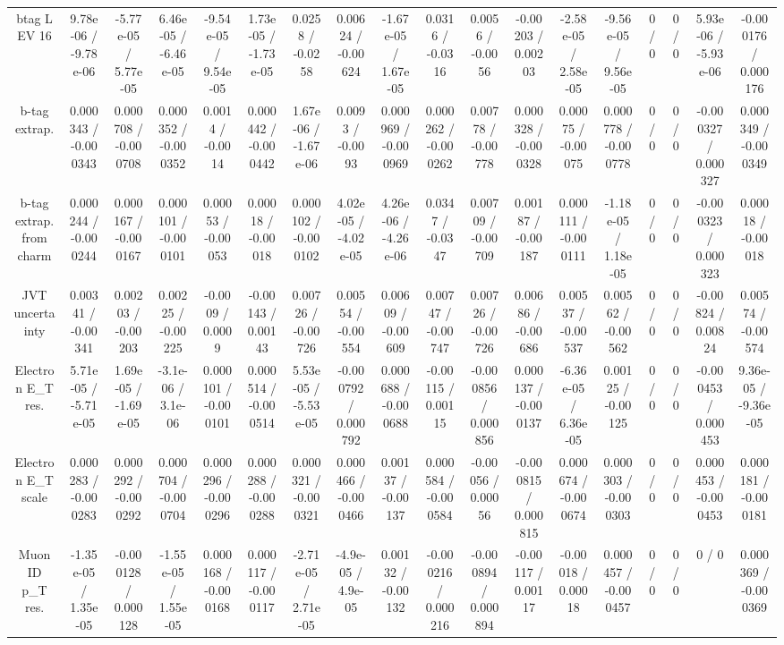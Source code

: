 \documentclass[10pt]{article}
\begin{document}
\begin{table}[htbp]
\begin{center}
\begin{tabular}{|c|c|c|c|c|c|c|c|c|c|c|c|c|c|c|c|c|c|}
  btag L EV 16 & 9.78e-06 / -9.78e-06 & -5.77e-05 / 5.77e-05 & 6.46e-05 / -6.46e-05 & -9.54e-05 / 9.54e-05 & 1.73e-05 / -1.73e-05 & 0.0258 / -0.0258 & 0.00624 / -0.00624 & -1.67e-05 / 1.67e-05 & 0.0316 / -0.0316 & 0.0056 / -0.0056 & -0.00203 / 0.00203 & -2.58e-05 / 2.58e-05 & -9.56e-05 / 9.56e-05 & 0 / 0 & 0 / 0 & 5.93e-06 / -5.93e-06 & -0.000176 / 0.000176 \\ 
  b-tag extrap. & 0.000343 / -0.000343 & 0.000708 / -0.000708 & 0.000352 / -0.000352 & 0.0014 / -0.0014 & 0.000442 / -0.000442 & 1.67e-06 / -1.67e-06 & 0.0093 / -0.0093 & 0.000969 / -0.000969 & 0.000262 / -0.000262 & 0.00778 / -0.00778 & 0.000328 / -0.000328 & 0.00075 / -0.00075 & 0.000778 / -0.000778 & 0 / 0 & 0 / 0 & -0.000327 / 0.000327 & 0.000349 / -0.000349 \\ 
  b-tag extrap. from charm & 0.000244 / -0.000244 & 0.000167 / -0.000167 & 0.000101 / -0.000101 & 0.00053 / -0.00053 & 0.00018 / -0.00018 & 0.000102 / -0.000102 & 4.02e-05 / -4.02e-05 & 4.26e-06 / -4.26e-06 & 0.0347 / -0.0347 & 0.00709 / -0.00709 & 0.00187 / -0.00187 & 0.000111 / -0.000111 & -1.18e-05 / 1.18e-05 & 0 / 0 & 0 / 0 & -0.000323 / 0.000323 & 0.00018 / -0.00018 \\ 
  JVT uncertainty & 0.00341 / -0.00341 & 0.00203 / -0.00203 & 0.00225 / -0.00225 & -0.0009 / 0.0009 & -0.00143 / 0.00143 & 0.00726 / -0.00726 & 0.00554 / -0.00554 & 0.00609 / -0.00609 & 0.00747 / -0.00747 & 0.00726 / -0.00726 & 0.00686 / -0.00686 & 0.00537 / -0.00537 & 0.00562 / -0.00562 & 0 / 0 & 0 / 0 & -0.00824 / 0.00824 & 0.00574 / -0.00574 \\ 
  Electron E_{T} res. & 5.71e-05 / -5.71e-05 & 1.69e-05 / -1.69e-05 & -3.1e-06 / 3.1e-06 & 0.000101 / -0.000101 & 0.000514 / -0.000514 & 5.53e-05 / -5.53e-05 & -0.000792 / 0.000792 & 0.000688 / -0.000688 & -0.00115 / 0.00115 & -0.000856 / 0.000856 & 0.000137 / -0.000137 & -6.36e-05 / 6.36e-05 & 0.00125 / -0.00125 & 0 / 0 & 0 / 0 & -0.000453 / 0.000453 & 9.36e-05 / -9.36e-05 \\ 
  Electron E_{T} scale & 0.000283 / -0.000283 & 0.000292 / -0.000292 & 0.000704 / -0.000704 & 0.000296 / -0.000296 & 0.000288 / -0.000288 & 0.000321 / -0.000321 & 0.000466 / -0.000466 & 0.00137 / -0.00137 & 0.000584 / -0.000584 & -0.00056 / 0.00056 & -0.000815 / 0.000815 & 0.000674 / -0.000674 & 0.000303 / -0.000303 & 0 / 0 & 0 / 0 & 0.000453 / -0.000453 & 0.000181 / -0.000181 \\ 
  Muon ID p_{T} res. & -1.35e-05 / 1.35e-05 & -0.000128 / 0.000128 & -1.55e-05 / 1.55e-05 & 0.000168 / -0.000168 & 0.000117 / -0.000117 & -2.71e-05 / 2.71e-05 & -4.9e-05 / 4.9e-05 & 0.00132 / -0.00132 & -0.000216 / 0.000216 & -0.000894 / 0.000894 & -0.00117 / 0.00117 & -0.00018 / 0.00018 & 0.000457 / -0.000457 & 0 / 0 & 0 / 0 & 0 / 0 & 0.000369 / -0.000369 \\ 

\end{tabular}
\end{center}
\end{table}
\end{document}
